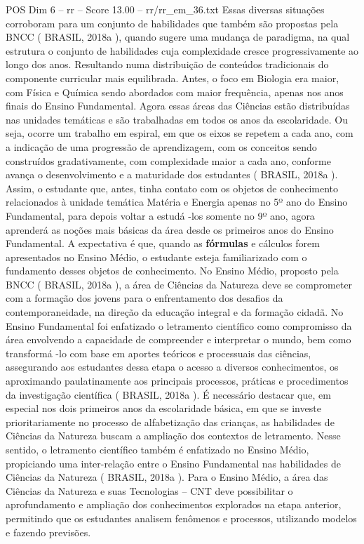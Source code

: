 \begin{textsample}{POS Dim 6 – rr – Score 13.00 – rr/rr\_em\_36.txt}
Essas diversas situações corroboram para um conjunto de habilidades que também são propostas pela BNCC ( BRASIL, 2018a ), quando sugere uma mudança de paradigma, na qual estrutura o conjunto de habilidades cuja complexidade cresce progressivamente ao longo dos anos.
Resultando numa distribuição de conteúdos tradicionais do componente curricular mais equilibrada.
Antes, o foco em Biologia era maior, com Física e Química sendo abordados com maior frequência, apenas nos anos finais do Ensino Fundamental.
Agora essas áreas das Ciências estão distribuídas nas unidades temáticas e são trabalhadas em todos os anos da escolaridade.
Ou seja, ocorre um trabalho em espiral, em que os eixos se repetem a cada ano, com a indicação de uma progressão de aprendizagem, com os conceitos sendo construídos gradativamente, com complexidade maior a cada ano, conforme avança o desenvolvimento e a maturidade dos estudantes ( BRASIL, 2018a ).
Assim, o estudante que, antes, tinha contato com os objetos de conhecimento relacionados à unidade temática Matéria e Energia apenas no 5º ano do Ensino Fundamental, para depois voltar a estudá -los somente no 9º ano, agora aprenderá as noções mais básicas da área desde os primeiros anos do Ensino Fundamental.
A expectativa é que, quando as \textbf{fórmulas} e cálculos forem apresentados no Ensino Médio, o estudante esteja familiarizado com o fundamento desses objetos de conhecimento.
No Ensino Médio, proposto pela BNCC ( BRASIL, 2018a ), a área de Ciências da Natureza deve se comprometer com a formação dos jovens para o enfrentamento dos desafios da contemporaneidade, na direção da educação integral e da formação cidadã.
No Ensino Fundamental foi enfatizado o letramento científico como compromisso da área envolvendo a capacidade de compreender e interpretar o mundo, bem como transformá -lo com base em aportes teóricos e processuais das ciências, assegurando aos estudantes dessa etapa o acesso a diversos conhecimentos, os aproximando paulatinamente aos principais processos, práticas e procedimentos da investigação científica ( BRASIL, 2018a ).
É necessário destacar que, em especial nos dois primeiros anos da escolaridade básica, em que se investe prioritariamente no processo de alfabetização das crianças, as habilidades de Ciências da Natureza buscam a ampliação dos contextos de letramento.
Nesse sentido, o letramento científico também é enfatizado no Ensino Médio, propiciando uma inter-relação entre o Ensino Fundamental nas habilidades de Ciências da Natureza ( BRASIL, 2018a ).
Para o Ensino Médio, a área das Ciências da Natureza e suas Tecnologias – CNT deve possibilitar o aprofundamento e ampliação dos conhecimentos explorados na etapa anterior, permitindo que os estudantes analisem fenômenos e processos, utilizando modelos e fazendo previsões.

\end{textsample}
